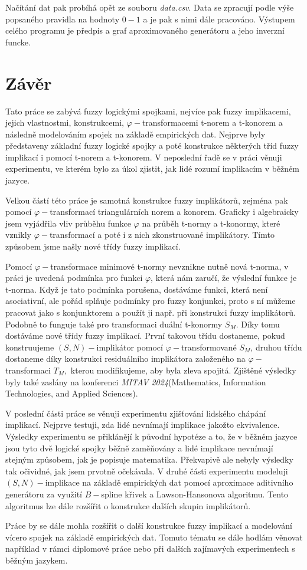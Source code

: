 Načítání dat pak probíhá opět ze souboru \textit{data.csv}. Data se zpracují podle výše popsaného pravidla na hodnoty $0-1$ a je pak s nimi dále pracováno. Výstupem celého programu je předpis a graf aproximovaného generátoru a jeho inverzní funcke.


\chapter{Závěr}

Tato práce se zabývá fuzzy logickými spojkami, nejvíce pak fuzzy implikacemi, jejich vlastnostmi, konstrukcemi, $\varphi-$transformacemi t-norem a t-konorem a následně modelováním spojek na základě empirických dat. Nejprve byly představeny  základní fuzzy logické spojky a poté konstrukce některých tříd fuzzy implikací i pomocí t-norem a t-konorem. V neposlední řadě se v práci věnuji experimentu, ve kterém bylo za \' ukol zjistit, jak lidé rozumí implikacím v běžném jazyce.

Velkou částí této práce je samotná konstrukce fuzzy implikátor\r u, zejména pak pomocí $\varphi-$transformací triangulárních norem a konorem. Graficky i algebraicky jsem vyjádřila vliv pr\r uběhu funkce $\varphi$ na pr\r uběh t-normy a t-konormy, které vznikly $\varphi-$transformací a poté i z nich zkonstruované implikátory. Tímto zp\r usobem jsme našly nové třídy fuzzy implikací. 

Pomocí $\varphi-$transformace minimové t-normy nevznikne nutně nová t-norma, v práci je uvedená podmínka pro funkci $\varphi$, která nám zaručí, že výslední funkce je t-norma. Když je tato podmínka porušena, dostáváme funkci, která není asociativní, ale pořád splňuje podmínky pro fuzzy konjunkci, proto s ní můžeme pracovat jako s konjunktorem a použít ji např. při konstrukci fuzzy implikátorů. Podobně to funguje také pro transformaci duální t-konormy $S_M.$ Díky tomu dostáváme nové třídy fuzzy implikací. První takovou třídu dostaneme, pokud  konstruujeme $(S,N)-$implikátor pomocí $\varphi-$transformované $S_M$, druhou třídu dostaneme díky konstrukci residuálního implikátora založeného na $\varphi-$transformaci $T_M,$ kterou modifikujeme, aby byla zleva spojitá. 
 Zjištěné výsledky byly také zaslány na konferenci \textit{MITAV 2024}(Mathematics, Information Technologies, and Applied Sciences).

V poslední části práce se věnuji experimentu zjiš\v tování lidského chápání implikací. Nejprve testuji, zda lidé nevnímají implikace jakožto ekvivalence. Výsledky experimentu se přiklánějí k p\r uvodní hypotéze a to, že v běžném jazyce jsou tyto dvě logické spojky běžně zamě\v novány a lidé implikace nevnímají stejným zp\r usobem, jak je popisuje matematika. Překvapivě ale nebyly výsledky tak očividné, jak jsem prvotně očekávala. V druhé části experimentu modeluji $(S,N)-$implikace na základě empirických dat pomocí aproximace aditivního generátoru za využití $B-$spline křivek a Lawson-Hansonova algoritmu. Tento algoritmus lze dále rozšířit o konstrukce dalších skupin implikátor\r u.

Práce by se dále mohla rozšířit o další konstrukce fuzzy implikací a modelování vícero spojek na základě empirických dat. Tomuto tématu se dále hodlám věnovat například v rámci diplomové práce nebo při dalších zajímavých experimentech s běžným jazykem.

